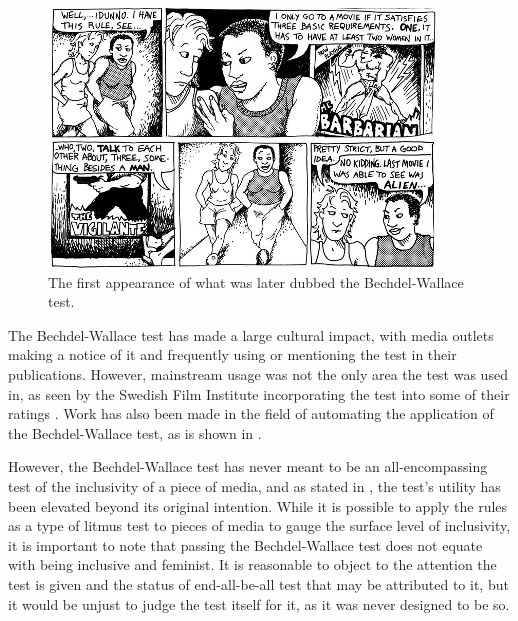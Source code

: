 \documentclass[a4paper, 11pt]{article}
\begin{document}
\begin{figure}[h!]
  \includegraphics[width=\linewidth]{figures/bechdel.jpg}
  \caption{The first appearance of what was later dubbed the Bechdel-Wallace test. \citep{bechdel}}
  \label{fig:bechdel}
\end{figure}

The Bechdel-Wallace test has made a large cultural impact, with media outlets making a notice of it and frequently using or mentioning the test in their publications. However, mainstream usage was not the only area the test was used in, as seen by the Swedish Film Institute incorporating the test into some of their ratings \citep{swedes}. Work has also been made in the field of automating the application of the Bechdel-Wallace test, as is shown in \citet{otherbechdelresearch}.

However, the Bechdel-Wallace test has never meant to be an all-encompassing test of the inclusivity of a piece of media, and as stated in \citet{zeisler}, the test's utility has been elevated beyond its original intention. While it is possible to apply the rules as a type of litmus test to pieces of media to gauge the surface level of inclusivity, it is important to note that passing the Bechdel-Wallace test does not equate with being inclusive and feminist. It is reasonable to object to the attention the test is given and the status of end-all-be-all test that may be attributed to it, but it would be unjust to judge the test itself for it, as it was never designed to be so.
\end{document}
